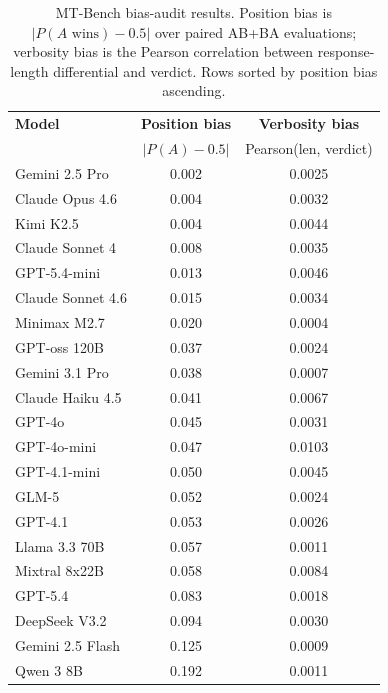 \documentclass[11pt]{article}
\begin{document}
\begin{table}[t]
\centering
\small
\begin{tabular}{lcc}
\toprule
\textbf{Model} & \textbf{Position bias} & \textbf{Verbosity bias} \\
& $\left|P(A)-0.5\right|$ & Pearson(len, verdict) \\
\midrule
Gemini 2.5 Pro    & 0.002 & 0.0025 \\
Claude Opus 4.6   & 0.004 & 0.0032 \\
Kimi K2.5         & 0.004 & 0.0044 \\
Claude Sonnet 4   & 0.008 & 0.0035 \\
GPT-5.4-mini      & 0.013 & 0.0046 \\
Claude Sonnet 4.6 & 0.015 & 0.0034 \\
Minimax M2.7      & 0.020 & 0.0004 \\
GPT-oss 120B      & 0.037 & 0.0024 \\
Gemini 3.1 Pro    & 0.038 & 0.0007 \\
Claude Haiku 4.5  & 0.041 & 0.0067 \\
GPT-4o            & 0.045 & 0.0031 \\
GPT-4o-mini       & 0.047 & 0.0103 \\
GPT-4.1-mini      & 0.050 & 0.0045 \\
GLM-5             & 0.052 & 0.0024 \\
GPT-4.1           & 0.053 & 0.0026 \\
Llama 3.3 70B     & 0.057 & 0.0011 \\
Mixtral 8x22B     & 0.058 & 0.0084 \\
GPT-5.4           & 0.083 & 0.0018 \\
DeepSeek V3.2     & 0.094 & 0.0030 \\
Gemini 2.5 Flash  & 0.125 & 0.0009 \\
Qwen 3 8B         & 0.192 & 0.0011 \\
\bottomrule
\end{tabular}
\caption{\footnotesize MT-Bench bias-audit results. Position bias is $\left|P(A
\text{ wins}) - 0.5\right|$ over paired AB+BA evaluations; verbosity
bias is the Pearson correlation between response-length differential
and verdict. Rows sorted by position bias ascending.}
\label{tab:bias}
\end{table}
\end{document}
